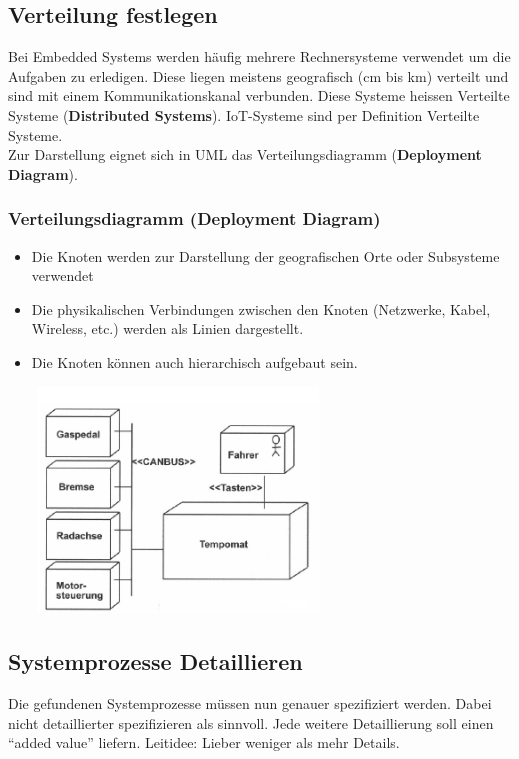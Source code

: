 \subsection{Verteilung festlegen}
Bei Embedded Systems werden häufig mehrere Rechnersysteme verwendet um die Aufgaben zu erledigen. Diese liegen meistens geografisch (cm bis km) verteilt und sind mit einem Kommunikationskanal verbunden. Diese Systeme heissen Verteilte Systeme (\textbf{Distributed Systems}). IoT-Systeme sind per Definition Verteilte Systeme.\\
Zur Darstellung eignet sich in UML das Verteilungsdiagramm (\textbf{Deployment Diagram}).

\subsubsection{Verteilungsdiagramm (Deployment Diagram)}
\begin{multicols}{2}
	\begin{itemize}
		\item Die Knoten werden zur Darstellung der geografischen Orte oder Subsysteme verwendet
		\item Die physikalischen Verbindungen zwischen den Knoten (Netzwerke, Kabel, Wireless, etc.) werden als Linien dargestellt.
		\item Die Knoten können auch hierarchisch aufgebaut sein.
	\end{itemize}
	\vfill\null
	\columnbreak
	\includegraphics[height=6cm, width = 9cm,]{images/Modellierung/Verteilungsdiagramm}
\end{multicols}

\subsection{Systemprozesse Detaillieren}
Die gefundenen Systemprozesse müssen nun genauer spezifiziert werden. Dabei nicht detaillierter spezifizieren als sinnvoll. Jede weitere Detaillierung soll einen "`added value"' liefern.
Leitidee: Lieber weniger als mehr Details.


